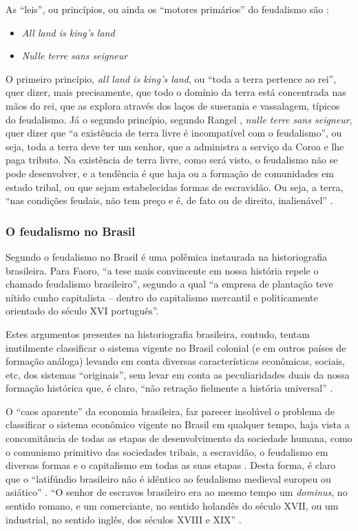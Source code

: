 \documentclass[
	12pt,				%
	oneside,			%
	a4paper,			%
	chapter=TITLE,		%
	section=TITLE,		%
	english,			%
	brazil				%
	]{abntex2}
\begin{document}
\begin{refsection}
As ``leis'', ou princípios, ou ainda os ``motores primários'' do feudalismo são
\autocite[126]{rangel1985}:
\begin{itemize}
\tightlist
\item
  \emph{All land is king's land}
\item
  \emph{Nulle terre sans seigneur}
\end{itemize}
O primeiro princípio, \emph{all land is king's land}, ou ``toda a terra pertence ao
rei'', quer dizer, mais precisamente, que todo o domínio da terra está
concentrada nas mãos do rei, que as explora através dos laços de suserania e
vassalagem, típicos do feudalismo. Já o segundo princípio, segundo Rangel
\autocite*[219]{rangel1961}, \emph{nulle terre sans seigneur}, quer dizer que ``a existência
de terra livre é incompatível com o feudalismo'', ou seja, toda a terra deve ter
um senhor, que a administra a serviço da Coroa e lhe paga tributo. Na existência
de terra livre, como será visto, o feudalismo não se pode desenvolver, e a
tendência é que haja ou a formação de comunidades em estado tribal, ou que sejam
estabelecidas formas de escravidão. Ou seja, a terra, ``nas condições feudais,
não tem preço e é, de fato ou de direito, inalienável'' \autocite[206]{rangel1960}.

\hypertarget{o-feudalismo-no-brasil}{%
\subsubsection{O feudalismo no Brasil}\label{o-feudalismo-no-brasil}}

Segundo \textcite[p.~155]{faoro} o feudalismo no Brasil é uma polêmica instaurada na
historiografia brasileira. Para Faoro, ``a tese mais convincente em nossa
história repele o chamado feudalismo brasileiro'', segundo a qual ``a empresa de
plantação teve nítido cunho capitalista -- dentro do capitalismo mercantil e
politicamente orientado do século XVI português''.

Estes argumentos presentes na historiografia brasileira, contudo, tentam
inutilmente classificar o sistema vigente no Brasil colonial (e em outros países
de formação análoga) levando em conta diversas características econômicas,
sociais, etc, dos sistemas ``originais'', sem levar em conta as peculiaridades
duais da nossa formação histórica que, é claro, ``não retração fielmente a
história universal'' \autocite[p.~296]{dualidade-basica}.

O ``caos aparente'' da economia brasileira, faz parecer insolúvel o problema de
classificar o sistema econômico vigente no Brasil em qualquer tempo, haja vista
a concomitância de todas as etapas de desenvolvimento da sociedade humana, como
o comunismo primitivo das sociedades tribais, a escravidão, o feudalismo em
diversas formas e o capitalismo em todas as suas etapas \autocite[
p.~293]{dualidade-basica}. Desta forma, é claro que o ``latifúndio brasileiro não é idêntico ao
feudalismo medieval europeu ou asiático'' \autocite[p.~293]{dualidade-basica}. ``O senhor
de escravos brasileiro era ao mesmo tempo um \emph{dominus}, no sentido romano, e um
comerciante, no sentido holandês do século XVII, ou um industrial, no sentido
inglês, dos séculos XVIII e XIX'' \autocite[p.~297]{dualidade-basica}.


\end{refsection}
\end{document}
